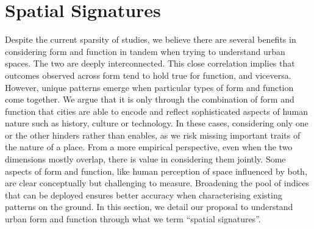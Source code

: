 \section{Spatial Signatures}
\label{sec:ss}

Despite the current sparsity of studies, we believe there are several benefits
in considering form and function in tandem when trying to understand urban
spaces.
The two are deeply interconnected. This close
correlation implies that outcomes observed across form tend to hold true for
function, and viceversa. However, unique patterns emerge when particular types
of form and function come together.
We argue that it is only through the combination of form and function
that cities are able to encode and reflect sophisticated aspects of human
nature such as history, culture or technology.
%
In these cases, considering only one or the other hinders rather than enables,
as we risk missing important traits of the nature of a place.
From a more empirical perspective, even when the two dimensions mostly
overlap, there is value in considering them jointly. Some aspects of form and
function, like human perception of space influenced by both, are clear conceptually but
challenging to measure. Broadening the
pool of indices that can be deployed ensures better accuracy when
characterising existing patterns on the ground.
%
In this section, we detail our proposal to understand urban form and function
through what we term “spatial signatures”.

